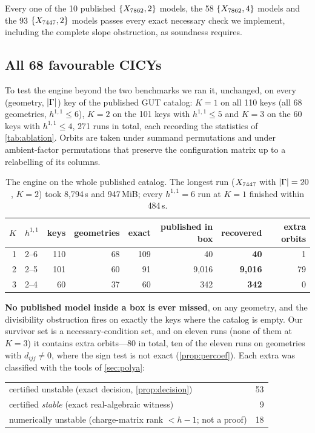 Every one of the 10 published $\{X_{7862},2\}$ models, the 58 $\{X_{7862},4\}$ models and
the 93 $\{X_{7447},2\}$ models passes every exact necessary check we implement,
including the complete slope obstruction, as soundness requires.

\subsection{All 68 favourable CICYs}
\label{sec:survey}

To test the engine beyond the two benchmarks we ran it, unchanged, on every
(geometry, $|\Gamma|$) key of the published GUT catalog: $K=1$ on all 110 keys
(all 68 geometries, $h^{1,1}\le6$), $K=2$ on the 101 keys with $h^{1,1}\le5$ and
$K=3$ on the 60 keys with $h^{1,1}\le4$, 271 runs in total, each recording the
statistics of \cref{tab:ablation}. Orbits
are taken under summand permutations and under ambient-factor permutations that
preserve the configuration matrix up to a relabelling of its columns.

\begin{table}[h]
\centering\small
\begin{tabular}{@{}rlrrrrrr@{}}
\toprule
$K$ & $h^{1,1}$ & keys & geometries & exact & published in box & recovered & extra orbits \\
\midrule
1 & 2--6 & 110 & 68 & 109 & 40 & \textbf{40} & 1 \\
2 & 2--5 & 101 & 60 & 91 & 9,016 & \textbf{9,016} & 79 \\
3 & 2--4 & 60 & 37 & 60 & 342 & \textbf{342} & 0 \\
\bottomrule
\end{tabular}
\caption{The engine on the whole published catalog. The longest run ($X_{7447}$ with
$|\Gamma|=20$, $K=2$) took 8,794\,s and 947\,MiB; every $h^{1,1}=6$ run at $K=1$
finished within 484\,s.}
\label{tab:survey}
\end{table}

\textbf{No published model inside a box is ever missed}, on any geometry, and the
divisibility obstruction fires on exactly the keys where the catalog is empty.
Our survivor set is a necessary-condition set, and on eleven runs (none of them at
$K=3$) it contains extra orbits---80 in total, ten of the eleven runs on geometries with
$d_{ijj}\neq0$, where the sign test is not exact (\cref{prop:percoef}). Each extra
was classified with the tools of \cref{sec:polya}:

\begin{center}\small
\begin{tabular}{@{}lr@{}}
\toprule
certified unstable (exact decision, \cref{prop:decision}) & 53 \\
certified \emph{stable} (exact real-algebraic witness) & 9 \\
numerically unstable (charge-matrix rank $<h-1$; not a proof) & 18 \\
\bottomrule
\end{tabular}
\end{center}

